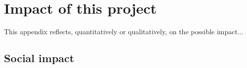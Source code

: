 \chapter{Impact of this project} \label{chap:impact}

    This appendix reflects, quantitatively or qualitatively, on the possible impact...

\section{Social impact} \label{sec:social_impact}

